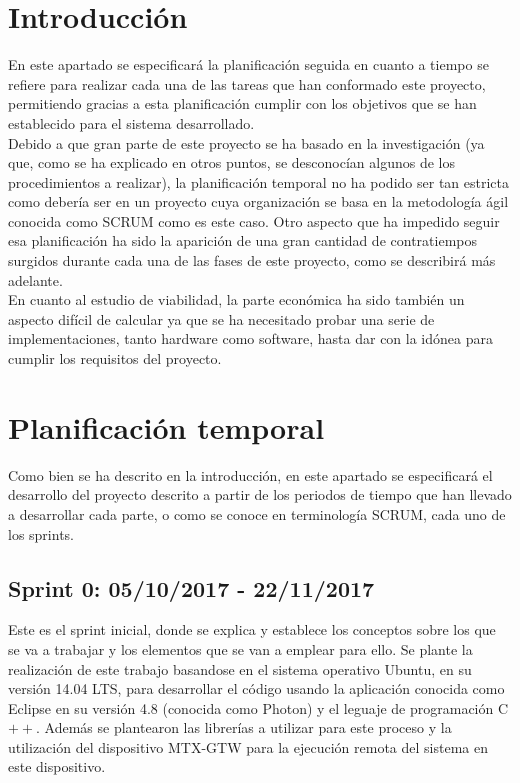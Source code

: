 
\section{Introducción}
En este apartado se especificará la planificación seguida en cuanto a tiempo se refiere para realizar cada una de las tareas que han conformado este proyecto, permitiendo gracias a esta planificación cumplir con los objetivos que se han establecido para el sistema desarrollado.\\
Debido a que gran parte de este proyecto se ha basado en la investigación (ya que, como se ha explicado en otros puntos, se desconocían algunos de los procedimientos a realizar), la planificación temporal no ha podido ser tan estricta como debería ser en un proyecto cuya organización se basa en la metodología ágil conocida como SCRUM como es este caso. Otro aspecto que ha impedido seguir esa planificación ha sido la aparición de una gran cantidad de contratiempos surgidos durante cada una de las fases de este proyecto, como se describirá más adelante.\\
En cuanto al estudio de viabilidad, la parte económica ha sido también un aspecto difícil de calcular ya que se ha necesitado probar una serie de implementaciones, tanto hardware como software, hasta dar con la idónea para cumplir los requisitos del proyecto.\\
 
\section{Planificación temporal}
Como bien se ha descrito en la introducción, en este apartado se especificará el desarrollo del proyecto descrito a partir de los periodos de tiempo que han llevado a desarrollar cada parte, o como se conoce en terminología SCRUM, cada uno de los sprints.\\
\subsection{Sprint 0: 05/10/2017 - 22/11/2017}
Este es el sprint inicial, donde se explica y establece los conceptos sobre los que se va a trabajar y los elementos que se van a emplear para ello. Se plante la realización de este trabajo basandose en el sistema operativo Ubuntu, en su versión 14.04 LTS, para desarrollar el código usando la aplicación conocida como Eclipse en su versión 4.8 (conocida como Photon) y el leguaje de programación C$++$. Además se plantearon las librerías a utilizar para este proceso y la utilización del dispositivo MTX-GTW para la ejecución remota del sistema en este dispositivo.\\
